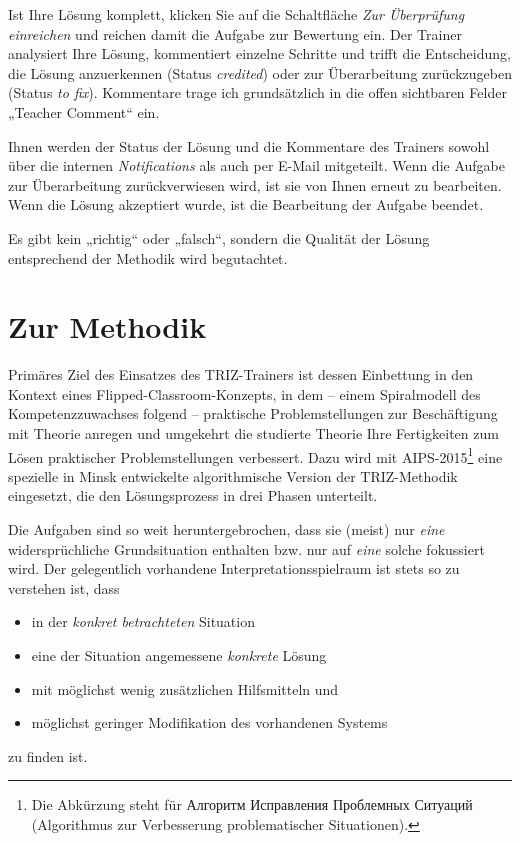 \documentclass[11pt,a4paper]{article}
\begin{document}
Ist Ihre Lösung komplett, klicken Sie auf die Schaltfläche \emph{Zur
  Überprüfung einreichen} und reichen damit die Aufgabe zur Bewertung ein.
Der Trainer analysiert Ihre Lösung, kommentiert einzelne Schritte und trifft
die Entscheidung, die Lösung anzuerkennen (Status \emph{credited}) oder zur
Überarbeitung zurückzugeben (Status \emph{to fix}).  Kommentare trage ich
grundsätzlich in die offen sichtbaren Felder „Teacher Comment“ ein.

Ihnen werden der Status der Lösung und die Kommentare des Trainers sowohl über
die internen \emph{Notifications} als auch per E-Mail mitgeteilt.  Wenn die
Aufgabe zur Überarbeitung zurückverwiesen wird, ist sie von Ihnen erneut zu
bearbeiten.  Wenn die Lösung akzeptiert wurde, ist die Bearbeitung der Aufgabe
beendet.

Es gibt kein „richtig“ oder „falsch“, sondern die Qualität der Lösung
entsprechend der Methodik wird begutachtet.

\section{Zur Methodik}

Primäres Ziel des Einsatzes des TRIZ-Trainers ist dessen Einbettung in den
Kontext eines Flipped-Classroom-Konzepts, in dem -- einem Spiralmodell des
Kompetenzzuwachses folgend -- praktische Problemstellungen zur Beschäftigung
mit Theorie anregen und umgekehrt die studierte Theorie Ihre Fertigkeiten zum
Lösen praktischer Problemstellungen verbessert. Dazu wird mit
AIPS-2015\footnote{Die Abkürzung steht für \foreignlanguage{russian}{Алгоритм
    Исправления Проблемных Ситуаций} (Algorithmus zur Verbesserung
  problematischer Situationen).}  eine spezielle in Minsk entwickelte
algorithmische Version der TRIZ-Methodik eingesetzt, die den Lösungsprozess in
drei Phasen unterteilt.

Die Aufgaben sind so weit heruntergebrochen, dass sie (meist) nur \emph{eine}
widersprüchliche Grundsituation enthalten bzw. nur auf \emph{eine} solche
fokussiert wird.  Der gelegentlich vorhandene Interpretationsspielraum ist
stets so zu verstehen ist, dass
\begin{itemize}\itemsep0pt
\item in der \emph{konkret betrachteten} Situation
\item eine der Situation angemessene \emph{konkrete} Lösung
\item mit möglichst wenig zusätzlichen Hilfsmitteln und 
\item möglichst geringer Modifikation des vorhandenen Systems
\end{itemize}
zu finden ist. 
\end{document}
